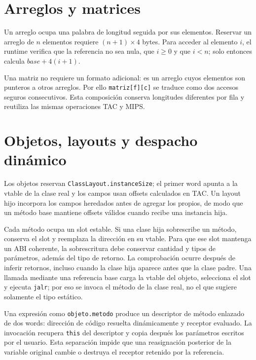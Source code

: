 \documentclass[11pt,letterpaper,oneside]{report}
\newcommand{\codigo}[1]{\texttt{#1}}
\begin{document}
\section{Arreglos y matrices}

Un arreglo ocupa una palabra de longitud seguida por sus elementos. Reservar un arreglo de $n$ elementos requiere $(n+1)\times4$ bytes. Para acceder al elemento $i$, el runtime verifica que la referencia no sea nula, que $i\geq0$ y que $i<n$; solo entonces calcula $base+4(i+1)$.

Una matriz no requiere un formato adicional: es un arreglo cuyos elementos son punteros a otros arreglos. Por ello \codigo{matriz[f][c]} se traduce como dos accesos seguros consecutivos. Esta composici\'on conserva longitudes diferentes por fila y reutiliza las mismas operaciones TAC y MIPS.

\section{Objetos, layouts y despacho din\'amico}

Los objetos reservan \codigo{ClassLayout.instanceSize}; el primer word apunta a la vtable de la clase real y los campos usan offsets calculados en TAC. Un layout hijo incorpora los campos heredados antes de agregar los propios, de modo que un m\'etodo base mantiene offsets v\'alidos cuando recibe una instancia hija.

Cada m\'etodo ocupa un slot estable. Si una clase hija sobrescribe un m\'etodo, conserva el slot y reemplaza la direcci\'on en su vtable. Para que ese slot mantenga un ABI coherente, la sobrescritura debe conservar cantidad y tipos de par\'ametros, adem\'as del tipo de retorno. La comprobaci\'on ocurre despu\'es de inferir retornos, incluso cuando la clase hija aparece antes que la clase padre. Una llamada mediante una referencia base carga la vtable del objeto, selecciona el slot y ejecuta \codigo{jalr}; por eso se invoca el m\'etodo de la clase real, no el que sugiere solamente el tipo est\'atico.

Una expresi\'on como \codigo{objeto.metodo} produce un descriptor de m\'etodo enlazado de dos words: direcci\'on de c\'odigo resuelta din\'amicamente y receptor evaluado. La invocaci\'on recupera \codigo{this} del descriptor y copia despu\'es los par\'ametros escritos por el usuario. Esta separaci\'on impide que una reasignaci\'on posterior de la variable original cambie o destruya el receptor retenido por la referencia.
\end{document}
